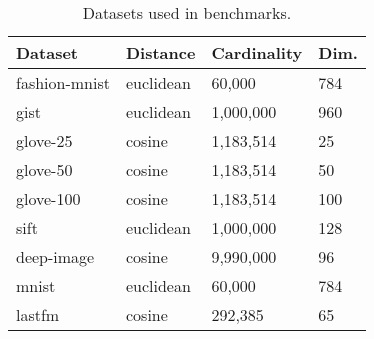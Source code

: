 \begin{table}[!t]
    \caption{Datasets used in benchmarks.}
    \label{table:datasets:summary}
    \vskip 0.15in
    \begin{center}
        \begin{small}
            \begin{sc}
                \begin{tabular}{|l|l|l|l|}
                    \hline
                    \textbf{Dataset} & \textbf{Distance}  &\textbf{Cardinality}  & \textbf{Dim.}  \\
                    \hline
                    fashion-mnist    & euclidean              & 60,000             & 784       \\
                    \hline 
                    gist             & euclidean              & 1,000,000          & 960       \\
                    \hline
                    glove-25         & cosine              & 1,183,514          & 25        \\
                    \hline
                    glove-50         & cosine              & 1,183,514          & 50        \\
                    \hline
                    glove-100        & cosine              & 1,183,514          & 100       \\
                    \hline
                    sift             & euclidean              & 1,000,000          & 128       \\
                    \hline
                    deep-image       & cosine              & 9,990,000          & 96        \\
                    \hline
                    mnist            & euclidean              & 60,000             & 784       \\
                    \hline
                    lastfm           & cosine              & 292,385            & 65        \\
                    \hline
                \end{tabular}
            \end{sc}
        \end{small}
    \end{center}
    \vskip -0.1in
\end{table}
